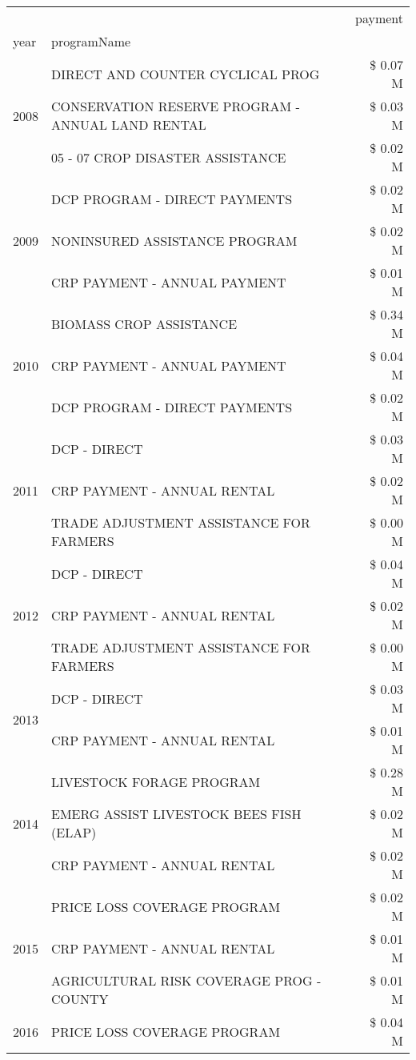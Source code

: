 \begin{tabular}{llr}
\toprule
 &  & payment \\
year & programName &  \\
\midrule
\multirow[t]{3}{*}{2008} & DIRECT AND COUNTER CYCLICAL PROG & \$ 0.07 M \\
 & CONSERVATION RESERVE PROGRAM - ANNUAL LAND RENTAL & \$ 0.03 M \\
 & 05 - 07 CROP DISASTER ASSISTANCE & \$ 0.02 M \\
\cline{1-3}
\multirow[t]{3}{*}{2009} & DCP PROGRAM - DIRECT PAYMENTS & \$ 0.02 M \\
 & NONINSURED ASSISTANCE PROGRAM & \$ 0.02 M \\
 & CRP PAYMENT - ANNUAL PAYMENT & \$ 0.01 M \\
\cline{1-3}
\multirow[t]{3}{*}{2010} & BIOMASS CROP ASSISTANCE & \$ 0.34 M \\
 & CRP PAYMENT - ANNUAL PAYMENT & \$ 0.04 M \\
 & DCP PROGRAM - DIRECT PAYMENTS & \$ 0.02 M \\
\cline{1-3}
\multirow[t]{3}{*}{2011} & DCP - DIRECT & \$ 0.03 M \\
 & CRP PAYMENT - ANNUAL RENTAL & \$ 0.02 M \\
 & TRADE ADJUSTMENT ASSISTANCE FOR FARMERS & \$ 0.00 M \\
\cline{1-3}
\multirow[t]{3}{*}{2012} & DCP - DIRECT & \$ 0.04 M \\
 & CRP PAYMENT - ANNUAL RENTAL & \$ 0.02 M \\
 & TRADE ADJUSTMENT ASSISTANCE FOR FARMERS & \$ 0.00 M \\
\cline{1-3}
\multirow[t]{2}{*}{2013} & DCP - DIRECT & \$ 0.03 M \\
 & CRP PAYMENT - ANNUAL RENTAL & \$ 0.01 M \\
\cline{1-3}
\multirow[t]{3}{*}{2014} & LIVESTOCK FORAGE PROGRAM & \$ 0.28 M \\
 & EMERG ASSIST LIVESTOCK BEES FISH (ELAP) & \$ 0.02 M \\
 & CRP PAYMENT - ANNUAL RENTAL & \$ 0.02 M \\
\cline{1-3}
\multirow[t]{3}{*}{2015} & PRICE LOSS COVERAGE PROGRAM & \$ 0.02 M \\
 & CRP PAYMENT - ANNUAL RENTAL & \$ 0.01 M \\
 & AGRICULTURAL RISK COVERAGE PROG - COUNTY & \$ 0.01 M \\
\cline{1-3}
\multirow[t]{3}{*}{2016} & PRICE LOSS COVERAGE PROGRAM                   & \$ 0.04 M \\

\end{tabular}
